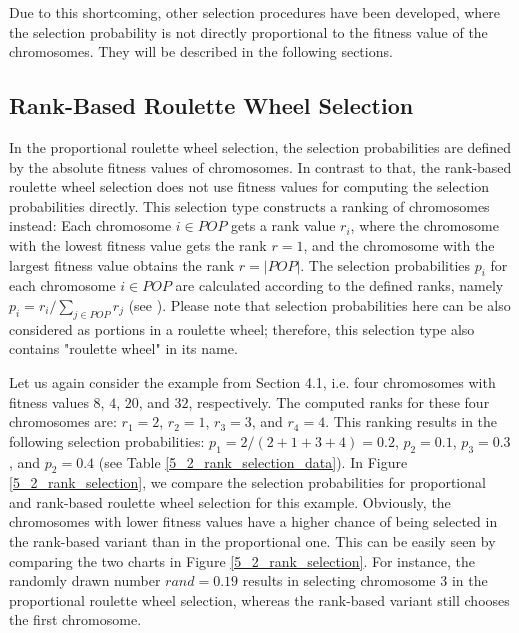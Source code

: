 Due to this shortcoming, other selection procedures have been developed, where the selection probability is not directly proportional to the fitness value of the chromosomes. They will be described in the following sections.\par

\subsection{Rank-Based Roulette Wheel Selection}
\label{subsec:rank_based}

In the proportional roulette wheel selection, the selection probabilities are defined by the absolute fitness values of chromosomes. In contrast to that, the rank-based roulette wheel selection does not use fitness values for computing the selection probabilities directly. This selection type constructs a ranking of chromosomes instead: Each chromosome $i \in POP$ gets a rank value $r_{i}$, where the chromosome with the lowest fitness value gets the rank $r = 1$, and the chromosome with the largest fitness value obtains the rank $r = |POP|$. The selection probabilities $p_{i}$ for each chromosome $i \in POP $ are calculated according to the defined ranks, namely $p_{i} = r_{i}/\sum_{j \in POP} r_{j}$ (see \cite{knust2020script}). Please note that selection probabilities here can be also considered as portions in a roulette wheel; therefore, this selection type also contains "roulette wheel" in its name.\par  

Let us again consider the example from Section 4.1, i.e. four chromosomes with fitness values $8$, $4$, $20$, and $32$, respectively. The computed ranks for these four chromosomes are: $r_{1} = 2$, $r_{2} = 1$, $r_{3} = 3$, and $r_{4} = 4$. This ranking results in the following selection probabilities: $p_{1} = 2/(2 + 1+ 3 + 4) = 0.2$, $p_{2} = 0.1$, $p_{3} = 0.3$, and $p_{2} = 0.4$ (see Table \ref{5_2_rank_selection_data}). In Figure \ref{5_2_rank_selection}, we compare the selection probabilities for proportional and rank-based roulette wheel selection for this example. Obviously, the chromosomes with lower fitness values have a higher chance of being selected in the rank-based variant than in the proportional one. This can be easily seen by comparing the two charts in Figure \ref{5_2_rank_selection}. For instance, the randomly drawn number $rand = 0.19$ results in selecting chromosome 3 in the proportional roulette wheel selection, whereas the rank-based variant still chooses the first chromosome.\par

